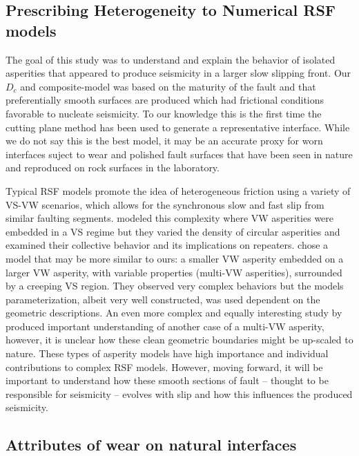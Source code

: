 \documentclass[final,3p, 11pt,authoryear]{elsarticle}
\begin{document}
\subsection{Prescribing Heterogeneity to Numerical RSF models}

The goal of this study was to understand and explain the behavior of isolated asperities that appeared to produce seismicity in a larger slow slipping front. Our $D_{c}$ and composite-model was based on the maturity of the fault and that preferentially smooth surfaces are produced which had frictional conditions favorable to nucleate seismicity.  To our knowledge this is the first time the cutting plane method has been used to generate a representative interface.  While we do not say this is the best model, it may be an accurate proxy for worn interfaces suject to wear and polished fault surfaces that have been seen in nature and reproduced on rock surfaces in the laboratory.  

Typical RSF models promote the idea of heterogeneous friction using a variety of VS-VW scenarios, which allows for the synchronous slow and fast slip from similar faulting segments. \citet{Dublanchet2013} modeled this complexity where VW asperities were embedded in a VS regime but they varied the density of circular asperities and examined their collective behavior and its implications on repeaters. \citet{Noda2013} chose a model that may be more similar to ours: a smaller VW asperity embedded on a larger VW asperity, with variable properties (multi-VW asperities), surrounded by a creeping VS region.  They observed very complex behaviors but the models parameterization, albeit very well constructed, was used dependent on the geometric descriptions. An even more complex and equally interesting study by \citet{Schaal2019} produced important understanding of another case of a multi-VW asperity, however, it is unclear how these clean geometric boundaries might be up-scaled to nature.  These types of asperity models have high importance and individual contributions to complex RSF models. However, moving forward, it will be important to understand how these smooth sections of fault -- thought to be responsible for seismicity -- evolves with slip and how this influences the produced seismicity. 

\subsection{Attributes of wear on natural interfaces}
\label{wear}
\end{document}
